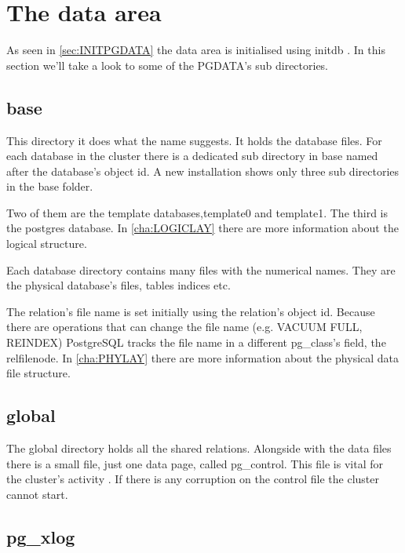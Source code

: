 \section{The data area}

\label{sec:PGDATA}

As seen in \ref{sec:INITPGDATA} the data area is initialised using initdb
. In this section we'll take a look to some of the PGDATA's sub
directories.

\subsection{base}

\label{sub:BASE}

This directory it does what the name suggests. It holds the database files. For
each database in the cluster there is a dedicated sub directory in base named
after the database's object id. A new installation shows only three sub
directories in the base folder.\newline

Two of them are the template databases,template0 and template1. The third is
the postgres database. In \ref{cha:LOGICLAY} there are more information about
the logical structure.\newline

Each database directory contains many files with the numerical names. They are
the physical database's files, tables indices etc.\newline

The relation's file name is set initially using the relation's object id.
Because there are operations that can change the file name (e.g. VACUUM FULL,
REINDEX) PostgreSQL tracks the file name in a different pg\_class's field, the
relfilenode. In \ref{cha:PHYLAY} there are more information about the physical
data file structure.

\subsection{global}

The global directory holds all the shared relations. Alongside with the data
files there is a small file, just one data page, called pg\_control. This file
is vital for the cluster's activity . If there is any
corruption on the control file the cluster cannot start.

\subsection{pg\_xlog}

